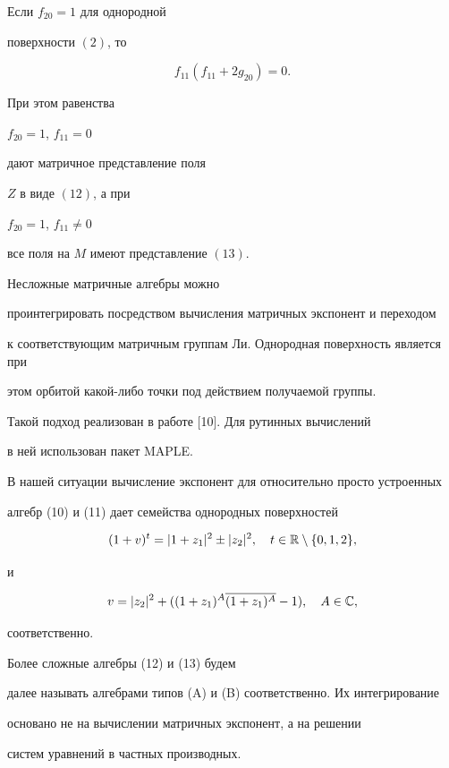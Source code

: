 \begin{prop}


Если $ f_{20} = 1 $ для однородной 


поверхности $(2)$, то 


$$


 f_{11} (f_{11} + 2 g_{20} ) = 0.


$$





 При этом равенства 


$ f_{20} = 1$, $f_{11} = 0 $


дают матричное представление поля 


$ Z $ в виде $(12)$, а при 


$ f_{20} = 1$, $f_{11} \ne 0 $ 


все поля на $ M $ имеют представление $(13)$.


\end{prop}





\begin{notenonum}


 Несложные матричные алгебры можно 


проинтегрировать посредством вычисления матричных экспонент и переходом 


к соответствующим матричным группам Ли. Однородная поверхность является при 


этом орбитой какой-либо точки под действием получаемой группы. 


 Такой подход реализован в работе [10]. Для рутинных вычислений 


в ней использован пакет MAPLE. 





В нашей ситуации вычисление экспонент для относительно просто устроенных


алгебр (10) и (11) дает семейства однородных поверхностей


$$


(1 + v )^t = | 1 + z_1 |^2 \pm | z_2 |^2, \quad t \in \Bbb R \setminus 


\{0,1,2 \}, 


$$


и


$$


v = |z_2|^2 + ( ( 1 + z_1)^A \overline {( 1+ z_1)^A } - 1 ), \quad


A \in \Bbb C, 


$$


соответственно.





Более сложные алгебры (12) и (13) будем 


далее называть алгебрами типов (A) и (B) соответственно. Их интегрирование


основано не на вычислении матричных экспонент, а на решении


систем уравнений в частных производных.


\end{notenonum}






